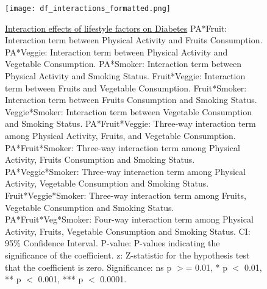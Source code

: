 \documentclass[11pt]{article}
\begin{document}
\begin{figure}[htbp]
\centering
\texttt{[image: df\_interactions\_formatted.png]}
\caption{\protect\hyperlink{file-df-interactions-pkl}{Interaction effects of lifestyle factors on Diabetes}
PA*Fruit: Interaction term between Physical Activity and Fruits Consumption. 
PA*Veggie: Interaction term between Physical Activity and Vegetable Consumption. 
PA*Smoker: Interaction term between Physical Activity and Smoking Status. 
Fruit*Veggie: Interaction term between Fruits and Vegetable Consumption. 
Fruit*Smoker: Interaction term between Fruits Consumption and Smoking Status. 
Veggie*Smoker: Interaction term between Vegetable Consumption and Smoking Status. 
PA*Fruit*Veggie: Three-way interaction term among Physical Activity, Fruits, and Vegetable Consumption. 
PA*Fruit*Smoker: Three-way interaction term among Physical Activity, Fruits Consumption and Smoking Status. 
PA*Veggie*Smoker: Three-way interaction term among Physical Activity, Vegetable Consumption and Smoking Status. 
Fruit*Veggie*Smoker: Three-way interaction term among Fruits, Vegetable Consumption and Smoking Status. 
PA*Fruit*Veg*Smoker: Four-way interaction term among Physical Activity, Fruits, Vegetable Consumption and Smoking Status. 
CI: 95\% Confidence Interval. 
P-value: P-values indicating the significance of the coefficient. 
z: Z-statistic for the hypothesis test that the coefficient is zero. 
Significance: ns p $>$= 0.01, * p $<$ 0.01, ** p $<$ 0.001, *** p $<$ 0.0001.}
\label{figure:df-interactions-formatted}
\end{figure}
% 
% 
% 
% 
% 
% 
\end{document}
